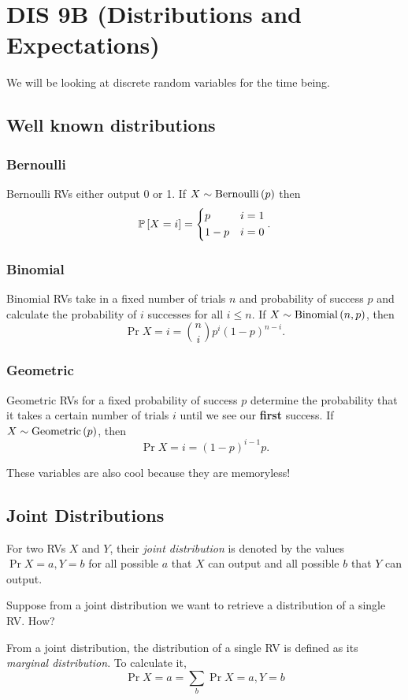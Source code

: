 \section{DIS 9B (Distributions and Expectations)}

We will be looking at discrete random variables for the time being. 

\subsection{Well known distributions}
\subsubsection{Bernoulli}
Bernoulli RVs either output 0 or 1. If $\Bern{X}{p}$ then \[ \Pr{X = i} = \begin{dcases} p & i = 1 \\ 1-p & i = 0 \\ \end{dcases}.\]

\subsubsection{Binomial}
Binomial RVs take in a fixed number of trials $n$ and probability of success $p$ and calculate the probability of $i$ successes for all $i \le n$. If $\Bin{X}{n}{p}$, then \[ \Pr{X = i} = \binom{n}{i} p^i(1-p)^{n-i}. \]

\subsubsection{Geometric}
Geometric RVs for a fixed probability of success $p$ determine the probability that it takes a certain number of trials $i$ until we see our \textbf{first} success. If $\Geo{X}{p}$, then \[ \Pr{X = i} = (1-p)^{i-1} p. \]

These variables are also cool because they are memoryless!

\subsection{Joint Distributions}
For two RVs $X$ and $Y$, their \textit{joint distribution} is denoted by the values $\Pr{X = a, Y = b}$ for all possible $a$ that $X$ can output and all possible $b$ that $Y$ can output. 

Suppose from a joint distribution we want to retrieve a distribution of a single RV. How?
\begin{definition}
    From a joint distribution, the distribution of a single RV is defined as its \textit{marginal distribution}. To calculate it, \[ \Pr{X = a} = \sum_{b} \Pr{X = a, Y = b} \]
\end{definition}


